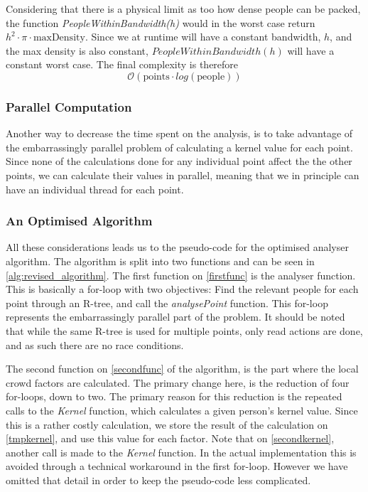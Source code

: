 Considering that there is a physical limit as too how dense people can be packed, the function \emph{PeopleWithinBandwidth(h)} would in the worst case return $h^2 \cdot \pi \cdot \text{maxDensity}$. Since we at runtime will have a constant bandwidth, $h$, and the max density is also constant, $PeopleWithinBandwidth(h)$ will have a constant worst case. The final complexity is therefore $$\mathcal{O}(\text{points} \cdot log(\text{people}))$$

\subsubsection{Parallel Computation}

Another way to decrease the time spent on the analysis, is to take advantage of the embarrassingly parallel problem of calculating a kernel value for each point. Since none of the calculations done for any individual point affect the the other points, we can calculate their values in parallel, meaning that we in principle can have an individual thread for each point.

\subsubsection{An Optimised Algorithm}
All these considerations leads us to the pseudo-code for the optimised analyser algorithm. The algorithm is split into two functions and can be seen in \cref{alg:revised_algorithm}. The first function on \cref{firstfunc} is the analyser function. This is basically a for-loop with two objectives: Find the relevant people for each point through an R-tree, and call the \emph{analysePoint} function. This for-loop represents the embarrassingly parallel part of the problem. It should be noted that while the same R-tree is used for multiple points, only read actions are done, and as such there are no race conditions.

The second function on \cref{secondfunc} of the algorithm, is the part where the local crowd factors are calculated. The primary change here, is the reduction of four for-loops, down to two. The primary reason for this reduction is the repeated calls to the \emph{Kernel} function, which calculates a given person's kernel value. Since this is a rather costly calculation, we store the result of the calculation on \cref{tmpkernel}, and use this value for each factor. Note that on \cref{secondkernel}, another call is made to the \emph{Kernel} function. In the actual implementation this is avoided through a technical workaround in the first for-loop. However we have omitted that detail in order to keep the pseudo-code less complicated.

